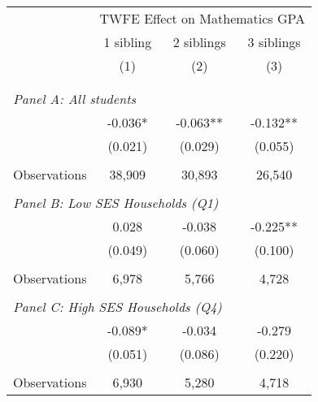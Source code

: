 \makeatletter
{}
{
\makeatother
\begin{tabular}{lccc}
\toprule
\cmidrule(lr){2-4}
& \multicolumn{3}{c}{TWFE Effect on Mathematics GPA} \\
\cmidrule(lr){2-4}
& 1 sibling & 2 siblings & 3 siblings  \\
\cmidrule(lr){2-2} \cmidrule(lr){3-3} \cmidrule(lr){4-4}
& (1) & (2) & (3)\\
\bottomrule
&  &  &  \\
&  &  &   \\
\multicolumn{4}{l}{\textit{Panel A: All students}} \\
\hspace{3mm}        &      -0.036*  &      -0.063** &      -0.132** \\
                    &     (0.021)   &     (0.029)   &     (0.055)   \\
                    &               &               &               \\
\hspace{3mm}Observations&      38,909   &      30,893   &      26,540   \\
 
&  &  &   \\
\multicolumn{4}{l}{\textit{Panel B: Low SES Households (Q1)}} \\
\hspace{3mm}        &       0.028   &      -0.038   &      -0.225** \\
                    &     (0.049)   &     (0.060)   &     (0.100)   \\
                    &               &               &               \\
\hspace{3mm}Observations&       6,978   &       5,766   &       4,728   \\
 
&  &  &   \\
\multicolumn{4}{l}{\textit{Panel C: High SES Households (Q4)}} \\
\hspace{3mm}        &      -0.089*  &      -0.034   &      -0.279   \\
                    &     (0.051)   &     (0.086)   &     (0.220)   \\
                    &               &               &               \\
\hspace{3mm}Observations&       6,930   &       5,280   &       4,718   \\
 

\end{tabular}}
